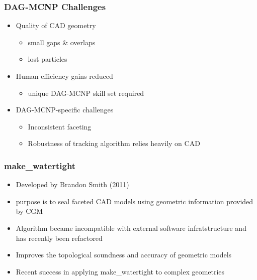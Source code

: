 \documentclass[14pt]{beamer}
\begin{document}
\begin{frame}
\frametitle{DAG-MCNP Challenges}
\begin{itemize}
\vfill

\item Quality of CAD geometry
	\begin{itemize}
	\color{red}
	\item small gaps \& overlaps
	\item lost particles
	\end{itemize}
\vfill
\item Human efficiency gains reduced
	\begin{itemize}
	\item unique DAG-MCNP skill set required	
	\end{itemize}
\vfill
\item DAG-MCNP-specific challenges
	\begin{itemize}
	\item Inconsistent faceting
	\item Robustness of tracking algorithm relies heavily on CAD
	\end{itemize}
\end{itemize}
\end{frame}



\begin{frame}
\frametitle{make\_watertight}
\begin{itemize}
\item Developed by Brandon Smith (2011)
\item purpose is to seal faceted CAD models using geometric information provided by CGM
\item Algorithm became incompatible with external software infratstructure and has recently been refactored
\item Improves the topological soundness and accuracy of geometric models
\item Recent success in applying make\_watertight to complex geometries
\end{itemize}
\end{frame}
\end{document}
